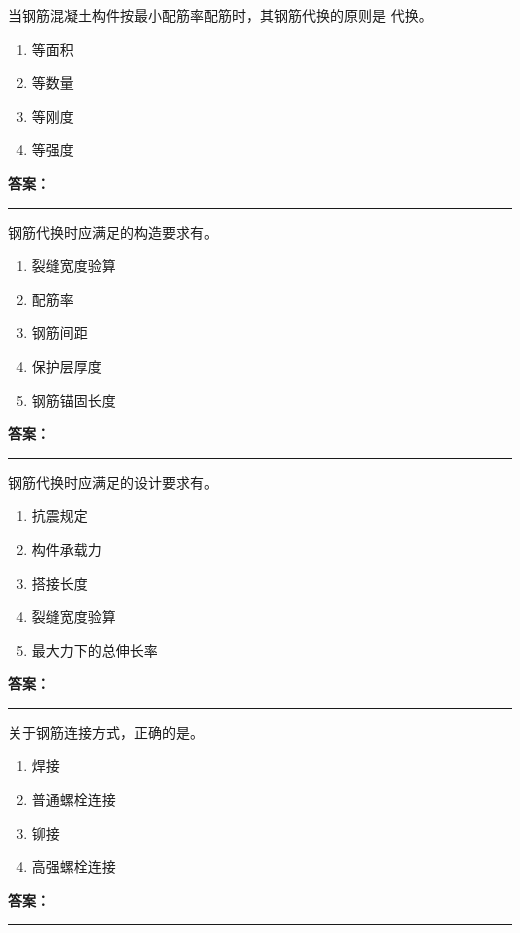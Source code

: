 \documentclass[UTF8,fontset=fandol,11pt]{ctexart}
\newcommand{\answerline}{\textcolor{answerred}{\rule{2.4cm}{0.7pt}}}
\begin{document}
\vspace{0.2em}

\begin{quizbox}[title={第 14 题}]
当钢筋混凝土构件按最小配筋率配筋时，其钢筋代换的原则是 代换。\\
\begin{enumerate}[label=\Alph*.]
\item 等面积
\item 等数量
\item 等刚度
\item 等强度
\end{enumerate}
\textbf{\textcolor{answerred}{答案：}} \answerline
\end{quizbox}

\vspace{0.2em}

\begin{quizbox}[title={第 15 题}]
钢筋代换时应满足的构造要求有。\\
\begin{enumerate}[label=\Alph*.]
\item 裂缝宽度验算
\item 配筋率
\item 钢筋间距
\item 保护层厚度
\item 钢筋锚固长度
\end{enumerate}
\textbf{\textcolor{answerred}{答案：}} \answerline
\end{quizbox}

\vspace{0.2em}

\begin{quizbox}[title={第 16 题}]
钢筋代换时应满足的设计要求有。\\
\begin{enumerate}[label=\Alph*.]
\item 抗震规定
\item 构件承载力
\item 搭接长度
\item 裂缝宽度验算
\item 最大力下的总伸长率
\end{enumerate}
\textbf{\textcolor{answerred}{答案：}} \answerline
\end{quizbox}

\vspace{0.2em}

\begin{quizbox}[title={第 17 题}]
关于钢筋连接方式，正确的是。\\
\begin{enumerate}[label=\Alph*.]
\item 焊接
\item 普通螺栓连接
\item 铆接
\item 高强螺栓连接
\end{enumerate}
\textbf{\textcolor{answerred}{答案：}} \answerline
\end{quizbox}
\end{document}
